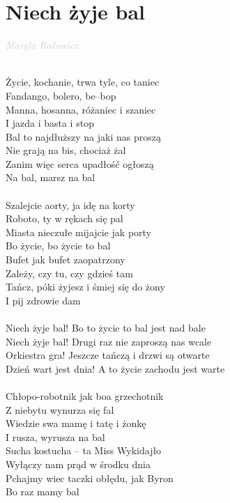 \documentclass[a5paper, 10pt]{book}
\begin{document}
\section{Niech żyje bal}\textcolor{lightgray}{\textit{Maryla Rodowicz}}\\~\\
\begin{minipage}[t]{0.8\textwidth}
Życie, kochanie, trwa tyle, co taniec\\
Fandango, bolero, be–bop\\
Manna, hosanna, różaniec i szaniec\\
I jazda i basta i stop\\
Bal to najdłuższy na jaki nas proszą\\
Nie grają na bis, chociaż żal\\
Zanim więc serca upadłość ogłoszą\\
Na bal, marsz na bal\\
\\
Szalejcie aorty, ja idę na korty\\
Roboto, ty w rękach się pal\\
Miasta nieczułe mijajcie jak porty\\
Bo życie, bo życie to bal\\
Bufet jak bufet zaopatrzony\\
Zależy, czy tu, czy gdzieś tam\\
Tańcz, póki żyjesz i śmiej się do żony\\
I pij zdrowie dam\\
\\
\hspace*{5mm}Niech żyje bal! Bo to życie to bal jest nad bale\\
\hspace*{5mm}Niech żyje bal! Drugi raz nie zaproszą nas wcale\\
\hspace*{5mm}Orkiestra gra! Jeszcze tańczą i drzwi są otwarte\\
\hspace*{5mm}Dzień wart jest dnia! A to życie zachodu jest warte\\
\\
Chłopo-robotnik jak boa grzechotnik\\
Z niebytu wynurza się fal\\
Wiedzie swa mamę i tatę i żonkę\\
I rusza, wyrusza na bal\\
Sucha kostucha – ta Miss Wykidajło\\
Wyłączy nam prąd w środku dnia\\
Pchajmy wiec taczki obłędu, jak Byron\\
Bo raz mamy bal\\
\end{minipage}
\end{document}

